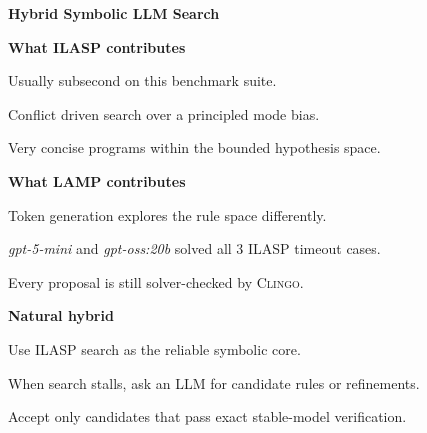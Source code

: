 \documentclass[20pt]{extarticle}
\newlength{\posterboxwidth}
\newlength{\posterbodywidth}
\newenvironment{posterbox}[1]
  {%
    \par\noindent
    \setlength{\posterboxwidth}{\dimexpr\linewidth-2pt\relax}%
    \setlength{\posterbodywidth}{\dimexpr\posterboxwidth-0.44in\relax}%
    \begin{lrbox}{\posterboxsave}%
    \begin{minipage}{\posterboxwidth}%
      \begingroup
      \setlength{\fboxsep}{0.08in}%
      \colorbox{potsdamblue}{%
        \parbox{\dimexpr\posterboxwidth-2\fboxsep\relax}{%
          \vspace{0.03in}%
          {\color{white}\bfseries\fontsize{24}{28}\selectfont #1\par}%
          \vspace{0.02in}%
        }%
      }%
      \endgroup
      \par\vspace{0.14in}%
      \hspace*{0.22in}\begin{minipage}{\posterbodywidth}%
  }
  {%
      \end{minipage}%
      \par\vspace{0.16in}%
    \end{minipage}%
    \end{lrbox}%
    \begingroup
    \setlength{\fboxsep}{0pt}%
    \setlength{\fboxrule}{1.0pt}%
    \fcolorbox{lineblue}{white}{\usebox{\posterboxsave}}%
    \endgroup
    \par
  }
\newcommand{\smallbody}{\fontsize{19}{22}\selectfont}
\newenvironment{tightitems}
  {\begin{list}{\textbullet}{%
    \setlength{\leftmargin}{0.36in}%
    \setlength{\itemsep}{0.12em}%
    \setlength{\topsep}{0.15em}%
    \setlength{\parsep}{0pt}%
    \setlength{\parskip}{0pt}}}
  {\end{list}}
\begin{document}
\begin{center}
\begin{minipage}{32.6in}
\begin{posterbox}{Hybrid Symbolic LLM Search}
\begin{minipage}[t]{0.315\linewidth}
\smallbody
\textbf{What ILASP contributes}
\begin{tightitems}
\item Usually subsecond on this benchmark suite.
\item Conflict driven search over a principled mode bias.
\item Very concise programs within the bounded hypothesis space.
\end{tightitems}
\end{minipage}\hfill
\begin{minipage}[t]{0.315\linewidth}
\smallbody
\textbf{What LAMP contributes}
\begin{tightitems}
\item Token generation explores the rule space differently.
\item \textit{gpt-5-mini} and \textit{gpt-oss:20b} solved all 3 ILASP timeout cases.
\item Every proposal is still solver-checked by \textsc{Clingo}.
\end{tightitems}
\end{minipage}\hfill
\begin{minipage}[t]{0.315\linewidth}
\smallbody
\textbf{Natural hybrid}
\begin{tightitems}
\item Use ILASP search as the reliable symbolic core.
\item When search stalls, ask an LLM for candidate rules or refinements.
\item Accept only candidates that pass exact stable-model verification.
\end{tightitems}
\end{minipage}

\vspace{0.12in}
\begingroup
\setlength{\fboxsep}{0.10in}
\setlength{\fboxrule}{0.9pt}
\endgroup
\end{posterbox}
\end{minipage}
\end{center}
\end{document}

